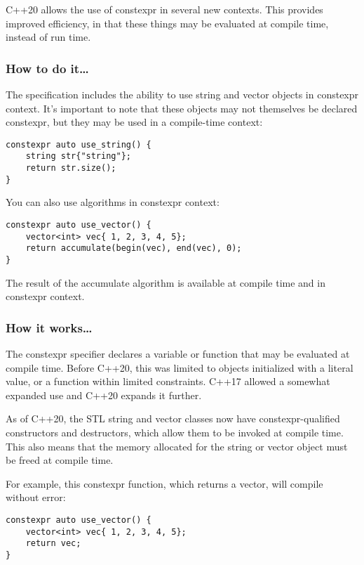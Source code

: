 
C++20 allows the use of constexpr in several new contexts. This provides improved efficiency, in that these things may be evaluated at compile time, instead of run time.


\subsubsection{How to do it…}

The specification includes the ability to use string and vector objects in constexpr context. It's important to note that these objects may not themselves be declared constexpr, but they may be used in a compile-time context:

\begin{lstlisting}[style=styleCXX]
constexpr auto use_string() {
	string str{"string"};
	return str.size();
}
\end{lstlisting}

You can also use algorithms in constexpr context:

\begin{lstlisting}[style=styleCXX]
constexpr auto use_vector() {
	vector<int> vec{ 1, 2, 3, 4, 5};
	return accumulate(begin(vec), end(vec), 0);
}
\end{lstlisting}

The result of the accumulate algorithm is available at compile time and in constexpr context.

\subsubsection{How it works…}

The constexpr specifier declares a variable or function that may be evaluated at compile time. Before C++20, this was limited to objects initialized with a literal value, or a function within limited constraints. C++17 allowed a somewhat expanded use and C++20 expands it further.

As of C++20, the STL string and vector classes now have constexpr-qualified constructors and destructors, which allow them to be invoked at compile time. This also means that the memory allocated for the string or vector object must be freed at compile time.

For example, this constexpr function, which returns a vector, will compile without error:

\begin{lstlisting}[style=styleCXX]
constexpr auto use_vector() {
	vector<int> vec{ 1, 2, 3, 4, 5};
	return vec;
}
\end{lstlisting}

